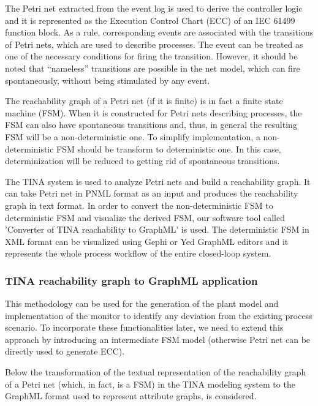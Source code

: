 \begin{bibunit}
The Petri net extracted from the event log is used to derive the controller logic and it is  represented as the Execution Control Chart (ECC) of an IEC 61499 function block. 
As a rule, corresponding events are associated with the transitions of Petri nets, which are used to describe processes. The event can be treated as one of the necessary conditions for firing the transition. However, it should be noted that “nameless” transitions are possible in the net model, which can fire spontaneously, without being stimulated by any event.

The reachability graph of a Petri net (if it is finite) is in fact a finite state machine (FSM). When it is constructed for Petri nets describing processes, the FSM can also have spontaneous transitions and, thus, in general the resulting FSM will be a non-deterministic one. To simplify implementation, a non-deterministic FSM should be transform to deterministic one. In this case, determinization will be reduced to getting rid of spontaneous transitions.

The TINA system \cite{berthomieu2004tool} is used to analyze Petri nets and build a reachability graph. It can take Petri net in PNML format as an input and produces the reachability graph in text format. In order to convert the non-deterministic FSM to deterministic FSM and visualize the derived FSM, our software tool called ’Converter of TINA reachability to GraphML’ is used. The deterministic FSM in XML format can be visualized using Gephi \cite{bastian2009gephi} or Yed \cite{wiese2004yfiles} GraphML editors and it represents the whole process workflow of the entire closed-loop system.


\hfill
\subsubsection{TINA reachability graph to GraphML application}
\hfill

\hfill


This methodology can be used for the generation of the plant model and implementation of  the monitor to identify any deviation from the existing process scenario. To incorporate these functionalities later, we need to extend this approach by introducing an  intermediate FSM model (otherwise Petri net can be directly used to generate ECC).

Below the transformation of the textual representation of the reachability graph of a Petri net (which, in fact, is a FSM) in the TINA  modeling system to the GraphML \cite{GraphMLSpec} format used to represent attribute graphs, is considered.


\end{bibunit}
